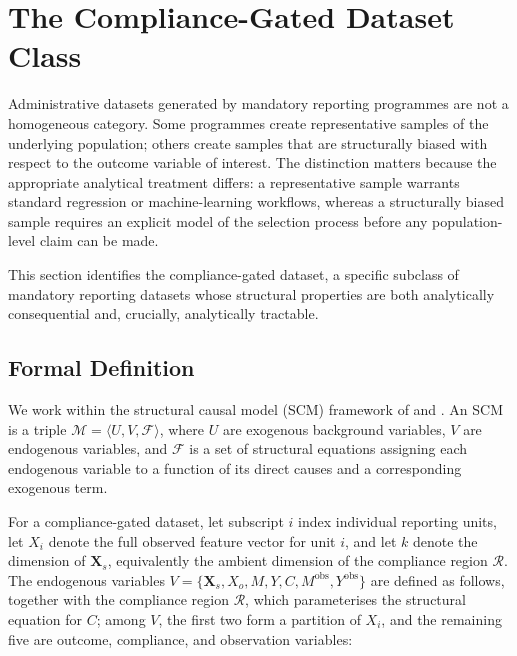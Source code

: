 \FloatBarrier
\section{The Compliance-Gated Dataset Class}

Administrative datasets generated by mandatory reporting programmes are not a homogeneous category. Some programmes create representative samples of the underlying population; others create samples that are structurally biased with respect to the outcome variable of interest. The distinction matters because the appropriate analytical treatment differs: a representative sample warrants standard regression or machine-learning workflows, whereas a structurally biased sample requires an explicit model of the selection process before any population-level claim can be made.

This section identifies the compliance-gated dataset, a specific subclass of mandatory reporting datasets whose structural properties are both analytically consequential and, crucially, analytically tractable.


\subsection{Formal Definition}

We work within the structural causal model (SCM) framework of  and . An SCM is a triple $\mathcal{M} = \langle U, V, \mathcal{F} \rangle$, where $U$ are exogenous background variables, $V$ are endogenous variables, and $\mathcal{F}$ is a set of structural equations assigning each endogenous variable to a function of its direct causes and a corresponding exogenous term.

For a compliance-gated dataset, let subscript $i$ index individual reporting units, let $X_i$ denote the full observed feature vector for unit $i$, and let $k$ denote the dimension of $\mathbf{X}_s$, equivalently the ambient dimension of the compliance region $\mathcal{R}$. The endogenous variables $V = \{\mathbf{X}_s, X_o, M, Y, C, M^{\text{obs}}, Y^{\text{obs}}\}$ are defined as follows, together with the compliance region $\mathcal{R}$, which parameterises the structural equation for $C$; among $V$, the first two form a partition of $X_i$, and the remaining five are outcome, compliance, and observation variables:

